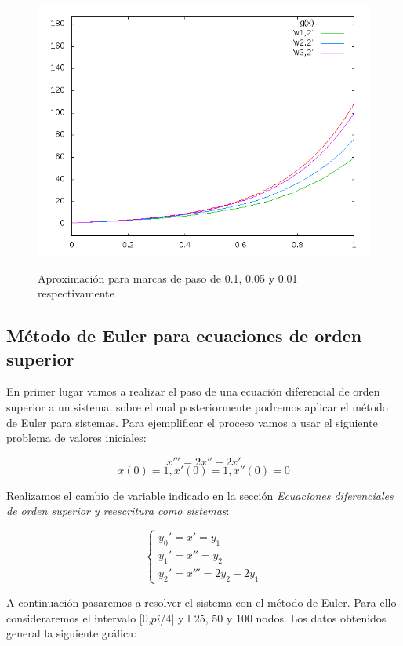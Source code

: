 \documentclass[12pt]{article}       %
\begin{document}
    \begin{figure}[H]
    	\centering
    	\includegraphics[scale=0.65]{img/grafica3.png}
    	\label{figura1}
    	\caption{Aproximación para marcas de paso de 0.1, 0.05 y 0.01 respectivamente} 
    \end{figure}


\subsection{Método de Euler para ecuaciones de orden superior}
 
En primer lugar vamos a realizar el paso de una ecuación diferencial de orden superior a un sistema, sobre el cual posteriormente podremos aplicar el método de Euler para sistemas. Para ejemplificar el proceso vamos a usar el siguiente problema de valores iniciales: 

$$
x''' = 2x'' - 2x'     %
$$
$$
x(0)=1, x'(0)=1, x''(0)=0
$$

Realizamos el cambio de variable indicado en la sección \textit{Ecuaciones diferenciales de orden superior y reescritura como sistemas}:

$$
\begin{cases}
y_0' = x' = y_1\\
y_1' = x'' = y_2\\
y_2' = x''' = 2y_2 - 2y_1
\end{cases}
$$

A continuación pasaremos a resolver el sistema con el método de Euler. Para ello consideraremos el intervalo [0,$pi$/4] y l 25, 50 y 100 nodos. Los datos obtenidos general la siguiente gráfica: 
\end{document}
